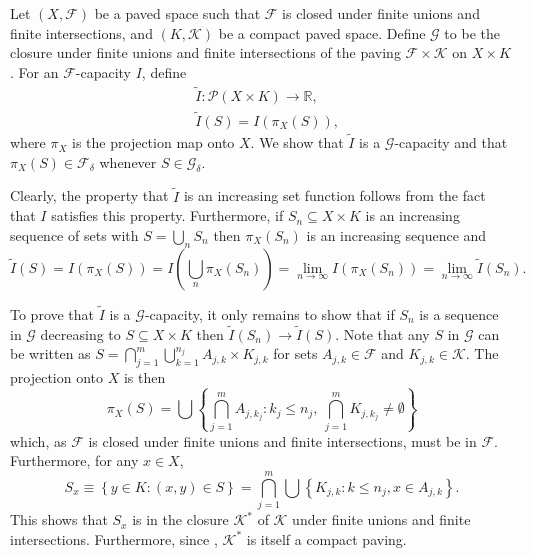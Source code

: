 \documentclass[12pt]{article}
\begin{document}

Let $(X,\mathcal{F})$ be a paved space such that $\mathcal{F}$ is closed under finite unions and finite intersections, and $(K,\mathcal{K})$ be a compact paved space.
Define $\mathcal{G}$ to be the closure under finite unions and finite intersections of the paving $\mathcal{F}\times\mathcal{K}$ on $X\times K$.
For an $\mathcal{F}$-capacity $I$, define
\begin{align*}
&\tilde I\colon\mathcal{P}(X\times K)\to\mathbb{R},\\
&\tilde I(S) = I(\pi_X(S)),
\end{align*}
where $\pi_X$ is the projection map onto $X$. We show that $\tilde I$ is a $\mathcal{G}$-capacity and that $\pi_X(S)\in\mathcal{F}_\delta$ whenever $S\in\mathcal{G}_\delta$.

Clearly, the property that $\tilde I$ is an increasing set function follows from the fact that $I$ satisfies this property. Furthermore, if $S_n\subseteq X\times K$ is an increasing sequence of sets with $S=\bigcup_nS_n$ then $\pi_X(S_n)$ is an increasing sequence and
\begin{equation*}
\tilde I(S)=I(\pi_X(S))=I\left(\bigcup_n\pi_X(S_n)\right)=\lim_{n\rightarrow\infty}I(\pi_X(S_n))=\lim_{n\rightarrow\infty}\tilde I(S_n).
\end{equation*}

To prove that $\tilde I$ is a $\mathcal{G}$-capacity, it only remains to show that if $S_n$ is a sequence in $\mathcal{G}$ decreasing to $S\subseteq X\times K$ then $\tilde I(S_n)\rightarrow \tilde I(S)$.
Note that any $S$ in $\mathcal{G}$ can be written as $S=\bigcap_{j=1}^m\bigcup_{k=1}^{n_j}A_{j,k}\times K_{j,k}$ for sets $A_{j,k}\in\mathcal{F}$ and $K_{j,k}\in\mathcal{K}$. The projection onto $X$ is then
\begin{equation*}
\pi_X(S)=\bigcup\left\{\bigcap_{j=1}^m A_{j,k_j}\colon k_j\le n_j,\ \bigcap_{j=1}^mK_{j,k_j}\not=\emptyset\right\}
\end{equation*}
which, as $\mathcal{F}$ is closed under finite unions and finite intersections, must be in $\mathcal{F}$.
Furthermore, for any $x\in X$,
\begin{equation*}
S_x\equiv\left\{y\in K\colon (x,y)\in S\right\}
=\bigcap_{j=1}^m\bigcup\left\{K_{j,k}\colon k\le n_j, x\in A_{j,k} \right\}.
\end{equation*}
This shows that $S_x$ is in the closure $\mathcal{K}^*$ of $\mathcal{K}$ under finite unions and finite intersections. Furthermore, since , $\mathcal{K}^*$ is itself a compact paving.
\end{document}

